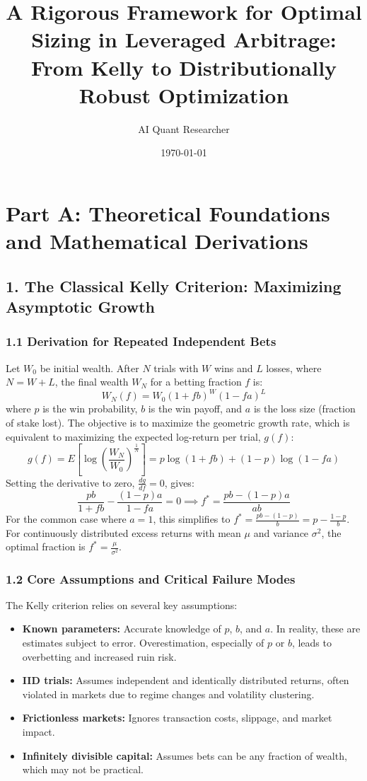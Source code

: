 \documentclass{article}
\begin{document}
\title{A Rigorous Framework for Optimal Sizing in Leveraged Arbitrage: From Kelly to Distributionally Robust Optimization}
\author{AI Quant Researcher}
\date{\today}
\maketitle

\section*{Part A: Theoretical Foundations and Mathematical Derivations}

\subsection*{1. The Classical Kelly Criterion: Maximizing Asymptotic Growth}

\subsubsection*{1.1 Derivation for Repeated Independent Bets}
Let $W_0$ be initial wealth. After $N$ trials with $W$ wins and $L$ losses, where $N = W+L$, the final wealth $W_N$ for a betting fraction $f$ is:
$$W_N(f) = W_0 (1+fb)^W (1-fa)^L$$
where $p$ is the win probability, $b$ is the win payoff, and $a$ is the loss size (fraction of stake lost). The objective is to maximize the geometric growth rate, which is equivalent to maximizing the expected log-return per trial, $g(f)$:
$$g(f) = E[\log(\frac{W_N}{W_0})^{\frac{1}{N}}] = p\log(1+fb) + (1-p)\log(1-fa)$$
Setting the derivative to zero, $\frac{dg}{df} = 0$, gives:
$$\frac{pb}{1+fb} - \frac{(1-p)a}{1-fa} = 0 \implies f^* = \frac{pb - (1-p)a}{ab}$$
For the common case where $a=1$, this simplifies to $f^* = \frac{pb - (1-p)}{b} = p - \frac{1-p}{b}$.  For continuously distributed excess returns with mean $\mu$ and variance $\sigma^2$, the optimal fraction is $f^* = \frac{\mu}{\sigma^2}$.

\subsubsection*{1.2 Core Assumptions and Critical Failure Modes}
The Kelly criterion relies on several key assumptions:
\begin{itemize}
    \item \textbf{Known parameters:} Accurate knowledge of $p$, $b$, and $a$. In reality, these are estimates subject to error. Overestimation, especially of $p$ or $b$, leads to overbetting and increased ruin risk.
    \item \textbf{IID trials:} Assumes independent and identically distributed returns, often violated in markets due to regime changes and volatility clustering.
    \item \textbf{Frictionless markets:} Ignores transaction costs, slippage, and market impact.
    \item \textbf{Infinitely divisible capital:} Assumes bets can be any fraction of wealth, which may not be practical.
\end{itemize}
\end{document}
